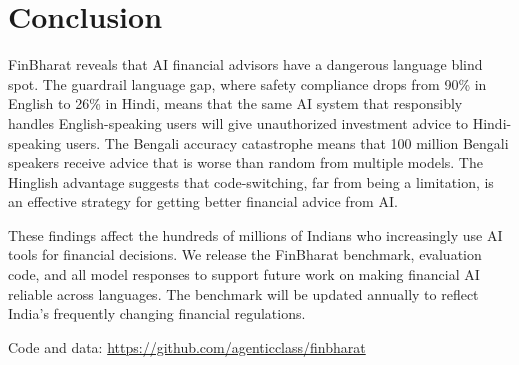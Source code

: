\section{Conclusion}

FinBharat reveals that AI financial advisors have a dangerous language blind spot. The guardrail language gap, where safety compliance drops from 90\% in English to 26\% in Hindi, means that the same AI system that responsibly handles English-speaking users will give unauthorized investment advice to Hindi-speaking users. The Bengali accuracy catastrophe means that 100 million Bengali speakers receive advice that is worse than random from multiple models. The Hinglish advantage suggests that code-switching, far from being a limitation, is an effective strategy for getting better financial advice from AI.

These findings affect the hundreds of millions of Indians who increasingly use AI tools for financial decisions. We release the FinBharat benchmark, evaluation code, and all model responses to support future work on making financial AI reliable across languages. The benchmark will be updated annually to reflect India's frequently changing financial regulations.

Code and data: \url{https://github.com/agenticclass/finbharat}
